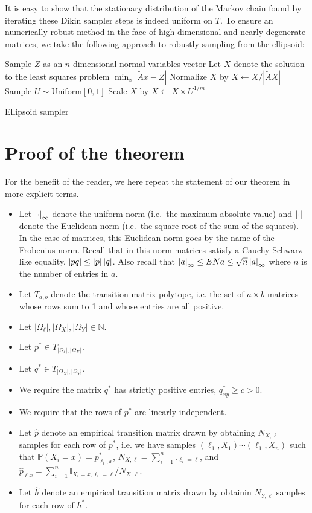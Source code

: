 It is easy to show that the stationary distribution of the Markov chain found by iterating these Dikin sampler steps is indeed uniform on $T$.  To ensure an numerically robust method in the face of high-dimensional and nearly degenerate matrices, we take the following approach to robustly sampling from the ellipsoid:

\begin{algorithm}[H]
 \vspace{.1in}
  Sample $Z$ as an $n$-dimensional normal variables vector\;
  Let $X$ denote the solution to the least squares problem $\min_x|\tilde Ax - Z|$\;
  Normalize $X$ by $X \gets X/|\tilde AX|$\;
  Sample $U \sim \mathrm{Uniform}[0,1]$\;
  Scale $X$ by $X \gets X \times U^{1/m}$\;
 \caption{Ellipsoid sampler}
\end{algorithm}


\section{Proof of the theorem}

\label{sec:proof}

For the benefit of the reader, we here repeat the statement of our theorem in more explicit terms.  

\begin{itemize}
\item Let $\left|\cdot\right|_\infty$ denote the uniform norm (i.e.\ the maximum absolute value) and $\left|\cdot\right|$ denote the Euclidean norm (i.e.\ the square root of the sum of the squares).  In the case of matrices, this Euclidean norm goes by the name of the Frobenius norm.  Recall that in this norm matrices satisfy a Cauchy-Schwarz like equality, $\left|pq\right|\leq\left|p\right|\left|q\right|$.  Also recall that $\left|a\right|_\infty \leq EN{a} \leq \sqrt{n}\left|a\right|_\infty$ where $n$ is the number of entries in $a$.
\item Let $T_{a,b}$ denote the transition matrix polytope, i.e. the set of $a\times b$ matrices whose rows sum to 1 and whose entries are all positive.
\item Let $|\Omega_\ell|,|\Omega_X|,|\Omega_Y| \in \mathbb{N}$.
\item Let $p^*\in T_{|\Omega_\ell|,|\Omega_X|}$.
\item Let $q^*\in T_{|\Omega_X|,|\Omega_Y|}$.
\item We require the matrix $q^*$ has strictly positive entries, $q^*_{xy}\geq c>0$.
\item We require that the rows of $p^*$ are linearly independent.
\item Let $\hat p$ denote an empirical transition matrix drawn by obtaining $N_{X,\ell}$ samples for each row of $p^*$, i.e. we have samples $(\ell_1,X_1) \cdots (\ell_1,X_n)$ such that $\mathbb{P}(X_i=x) = p^*_{\ell_i,x}$, $N_{X,\ell}=\sum_{i=1}^n \mathbb{I}_{\ell_i=\ell}$, and $\hat p_{\ell x} = \sum_{i=1}^n \mathbb{I}_{X_i=x,\ell_i=\ell} / N_{X,\ell}$. 
\item Let $\hat h$ denote an empirical transition matrix drawn by obtainin $N_{Y,\ell}$ samples for each row of $h^*$.  
\end{itemize}


